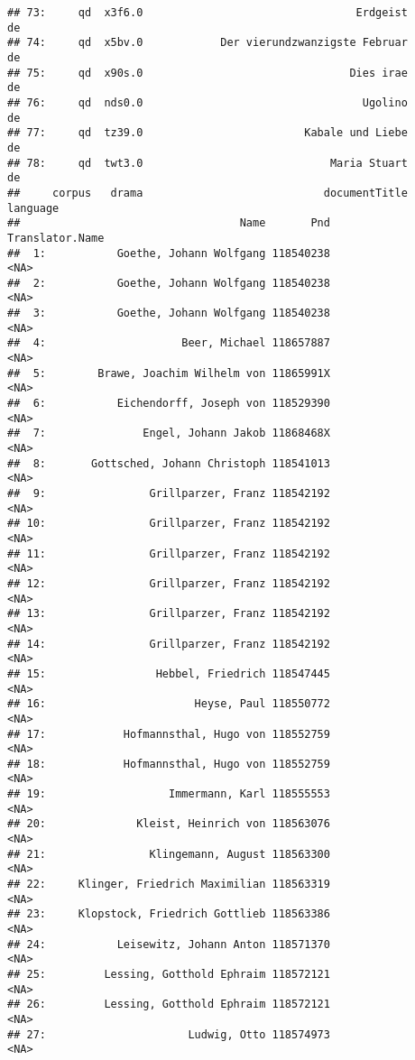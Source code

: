 \documentclass[]{book}
\begin{document}
\begin{verbatim}
## 73:     qd  x3f6.0                                 Erdgeist       de
## 74:     qd  x5bv.0            Der vierundzwanzigste Februar       de
## 75:     qd  x90s.0                                Dies irae       de
## 76:     qd  nds0.0                                  Ugolino       de
## 77:     qd  tz39.0                         Kabale und Liebe       de
## 78:     qd  twt3.0                             Maria Stuart       de
##     corpus   drama                            documentTitle language
##                                  Name       Pnd          Translator.Name
##  1:           Goethe, Johann Wolfgang 118540238                     <NA>
##  2:           Goethe, Johann Wolfgang 118540238                     <NA>
##  3:           Goethe, Johann Wolfgang 118540238                     <NA>
##  4:                     Beer, Michael 118657887                     <NA>
##  5:        Brawe, Joachim Wilhelm von 11865991X                     <NA>
##  6:           Eichendorff, Joseph von 118529390                     <NA>
##  7:               Engel, Johann Jakob 11868468X                     <NA>
##  8:       Gottsched, Johann Christoph 118541013                     <NA>
##  9:                Grillparzer, Franz 118542192                     <NA>
## 10:                Grillparzer, Franz 118542192                     <NA>
## 11:                Grillparzer, Franz 118542192                     <NA>
## 12:                Grillparzer, Franz 118542192                     <NA>
## 13:                Grillparzer, Franz 118542192                     <NA>
## 14:                Grillparzer, Franz 118542192                     <NA>
## 15:                 Hebbel, Friedrich 118547445                     <NA>
## 16:                       Heyse, Paul 118550772                     <NA>
## 17:            Hofmannsthal, Hugo von 118552759                     <NA>
## 18:            Hofmannsthal, Hugo von 118552759                     <NA>
## 19:                   Immermann, Karl 118555553                     <NA>
## 20:              Kleist, Heinrich von 118563076                     <NA>
## 21:                Klingemann, August 118563300                     <NA>
## 22:     Klinger, Friedrich Maximilian 118563319                     <NA>
## 23:     Klopstock, Friedrich Gottlieb 118563386                     <NA>
## 24:           Leisewitz, Johann Anton 118571370                     <NA>
## 25:         Lessing, Gotthold Ephraim 118572121                     <NA>
## 26:         Lessing, Gotthold Ephraim 118572121                     <NA>
## 27:                      Ludwig, Otto 118574973                     <NA>

\end{verbatim}
\end{document}
